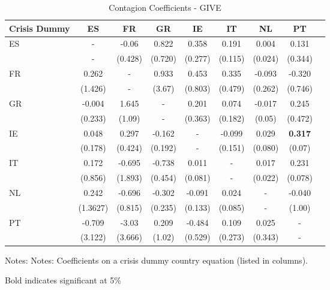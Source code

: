 \documentclass[/../base.tex]{subfiles}
\begin{document}
\begin{table}[H]
	\centering
	\begin{threeparttable}
		\caption{Contagion Coefficients - GIVE}
		\centering
		\begin{tabular}{p{1.5cm}*{8}{c}}
			\toprule
			\toprule
			Crisis Dummy & ES & FR & GR & IE & IT & NL & PT \\
			\midrule
			\multirow{2}{*}{ES} & - & -0.06 & 0.822 & 0.358 & 0.191 & 0.004 & 0.131 \\
			& - & (0.428) & (0.720) & (0.277) & (0.115) & (0.024) & (0.344)\\
			\multirow{2}{*}{FR} & 0.262 & - & 0.933 & 0.453 & 0.335 & -0.093 & -0.320 \\
			& (1.426) & - & (3.67) & (0.803) & (0.479) & (0.262) & (0.746) \\
			\multirow{2}{*}{GR} & -0.004 & 1.645 & - & 0.201 & 0.074 & -0.017 & 0.245 \\
			& (0.233) & (1.09) & - & (0.363) & (0.182) & (0.05) & (0.472)\\
			\multirow{2}{*}{IE} & 0.048 & 0.297 & -0.162 & - & -0.099 & 0.029 & \textbf{0.317}\\
			& (0.178) & (0.424) & (0.192) & - & (0.151) & (0.080) & (0.07)\\
			\multirow{2}{*}{IT} & 0.172 & -0.695 & -0.738 &  0.011 & - & 0.017 & 0.231\\
			& (0.856) & (1.893) & (0.454) & (0.081) & - & (0.022) & (0.078)\\
			\multirow{2}{*}{NL} & 0.242 & -0.696 & -0.302 & -0.091 & 0.024 & - & -0.040\\
			& (1.3627) & (0.815) & (0.235) & (0.133) & (0.085) & - & (1.00)\\
			\multirow{2}{*}{PT} & -0.709 & -3.03 & 0.209 & -0.484 & 0.109 & 0.025 & -\\
			& (3.122) & (3.666) & (1.02) & (0.529) & (0.273) & (0.343) & -\\           
			\bottomrule
			\bottomrule
		\end{tabular}
		\begin{tablenotes}
			\small
			\item Notes: Notes: Coefficients on a crisis dummy country equation (listed in columns). 
			\item Bold indicates significant at 5\%
		\end{tablenotes} 
		\label{tab:contagion_give_a}
	\end{threeparttable}
\end{table}
\end{document}
